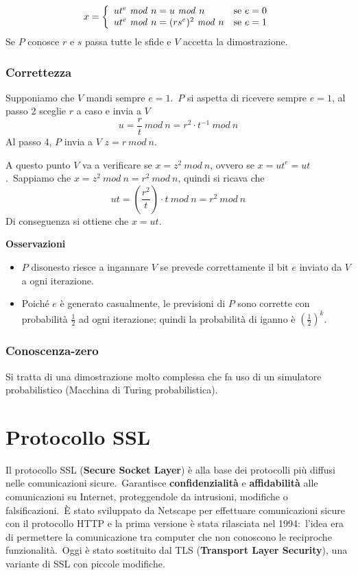 \[x = \left\{\begin{array}{l l}
        ut^e\ \mathit{mod}\ n = u\ \mathit{mod}\ n        & \mathrm{se}\ e = 0 \\
        ut^e\ \mathit{mod}\ n = (rs^e)^2\ \mathit{mod}\ n & \mathrm{se}\ e = 1 \\
    \end{array}\right.\]
Se $P$ conosce $r$ e $s$ passa tutte le sfide e $V$ accetta la dimostrazione.

\subsubsection{Correttezza}

Supponiamo che $V$ mandi sempre $e = 1$.\
$P$ si aspetta di ricevere sempre $e =1$, al passo 2 sceglie $r$ a caso e invia a $V$
\[u = \frac{r}{t}\ \mathit{mod}\ n = r^2 \cdot t^{-1}\ \mathit{mod}\ n\]
Al passo 4, $P$ invia a $V$ $z = r\ \mathit{mod}\ n$.\

A questo punto $V$ va a verificare se $ x = z^2\ \mathit{mod}\ n$, ovvero se $x = ut^e = ut$.\
Sappiamo che $x = z^2\ \mathit{mod}\ n = r^2\ \mathit{mod}\ n$, quindi si ricava che
\[ut = \left(\frac{r^2}{t}\right) \cdot t\ \mathit{mod}\ n = r^2\ \mathit{mod}\ n\]
Di conseguenza si ottiene che $x = ut$.

\noindent \textbf{Osservazioni}
\begin{itemize}
    \item $P$ disonesto riesce a ingannare $V$ se prevede correttamente il bit $e$ inviato da $V$ a ogni iterazione.\
    \item Poiché $e$ è generato casualmente, le previsioni di $P$ sono corrette con probabilità $\frac{1}{2}$ ad ogni iterazione; quindi la probabilità di iganno è $\left(\frac{1}{2}\right)^k$.\
\end{itemize}

\subsubsection{Conoscenza-zero}

Si tratta di una dimostrazione molto complessa che fa uso di un simulatore probabilistico (Macchina di Turing probabilistica).\

\section{Protocollo SSL}

Il protocollo SSL (\textbf{Secure Socket Layer}) è alla base dei protocolli più diffusi nelle comunicazioni sicure.\
Garantisce \textbf{confidenzialità} e \textbf{affidabilità} alle comunicazioni su Internet, proteggendole da intrusioni, modifiche o falsificazioni.\
È stato sviluppato da Netscape per effettuare comunicazioni sicure con il protocollo HTTP e la prima versione è stata rilasciata nel 1994:\ l'idea era di permettere la comunicazione tra computer che non conoscono le reciproche funzionalità.\
Oggi è stato sostituito dal TLS (\textbf{Transport Layer Security}), una variante di SSL con piccole modifiche.\

